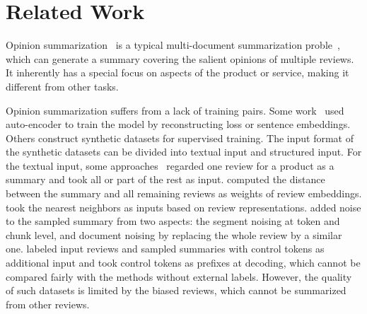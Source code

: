 \section{Related Work}
\label{sec:related}

Opinion summarization~\cite{GeraniMCNN14,rtopi21} is a typical multi-document summarization proble~\cite{abs-2011-04843,FabbriLSLR19,ZajicDL08},
which can generate a summary covering the salient opinions
of multiple reviews. It inherently has a special focus on aspects of the product or service, 
making it different from other tasks.

Opinion summarization suffers from a lack of training pairs. 
Some work~\cite{MeanSum19, Copycat20,tree21} used auto-encoder to train the model by 
reconstructing loss or sentence embeddings. 
Others construct synthetic datasets for supervised training. 
The input format of the synthetic datasets can be divided into 
textual input and structured input.  
For the textual input,
some approaches~\cite{Fewshot20,transsum21}
regarded one review for a product as a summary 
and took all or part of the rest as input. 
\citet{transsum21} computed the distance between the summary and all remaining reviews as weights of review embeddings.
\citet{Plansum20} took the nearest neighbors as inputs based on review representations.
\citet{Denoise20} added noise to the sampled summary from two aspects: the segment noising at token and chunk level, and document noising by replacing the whole review by a similar one. 
\citet{prefix21} labeled input reviews and sampled summaries with control tokens as additional input and took control tokens as prefixes at decoding,
which cannot be compared fairly with the methods without external labels.
However, the quality of such datasets is limited by the biased reviews, 
which cannot be summarized from other reviews. 


